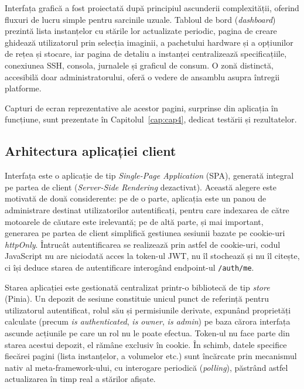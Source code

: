 Interfața grafică a fost proiectată după principiul ascunderii complexității, oferind fluxuri de lucru simple pentru sarcinile uzuale. Tabloul de bord (\textit{dashboard}) prezintă lista instanțelor cu stările lor actualizate periodic, pagina de creare ghidează utilizatorul prin selecția imaginii, a pachetului hardware și a opțiunilor de rețea și stocare, iar pagina de detaliu a instanței centralizează specificațiile, conexiunea SSH, consola, jurnalele și graficul de consum. O zonă distinctă, accesibilă doar administratorului, oferă o vedere de ansamblu asupra întregii platforme.

Capturi de ecran reprezentative ale acestor pagini, surprinse din aplicația în funcțiune, sunt prezentate în Capitolul~\ref{cap:cap4}, dedicat testării și rezultatelor.

\subsection{Arhitectura aplicației client}
\label{subsec:cap3_frontend}

Interfața este o aplicație de tip \textit{Single-Page Application} (SPA), generată integral pe partea de client (\textit{Server-Side Rendering} dezactivat). Această alegere este motivată de două considerente: pe de o parte, aplicația este un panou de administrare destinat utilizatorilor autentificați, pentru care indexarea de către motoarele de căutare este irelevantă; pe de altă parte, și mai important, generarea pe partea de client simplifică gestiunea sesiunii bazate pe cookie-uri \textit{httpOnly}. Întrucât autentificarea se realizează prin astfel de cookie-uri, codul JavaScript nu are niciodată acces la token-ul JWT, nu îl stochează și nu îl citește, ci își deduce starea de autentificare interogând endpoint-ul \texttt{/auth/me}.

Starea aplicației este gestionată centralizat printr-o bibliotecă de tip \textit{store} (Pinia). Un depozit de sesiune constituie unicul punct de referință pentru utilizatorul autentificat, rolul său și permisiunile derivate, expunând proprietăți calculate (precum \textit{is authenticated}, \textit{is owner}, \textit{is admin}) pe baza cărora interfața ascunde acțiunile pe care un rol nu le poate efectua. Token-ul nu face parte din starea acestui depozit, el rămâne exclusiv în cookie. În schimb, datele specifice fiecărei pagini (lista instanțelor, a volumelor etc.) sunt încărcate prin mecanismul nativ al meta-framework-ului, cu interogare periodică (\textit{polling}), păstrând astfel actualizarea în timp real a stărilor afișate.

